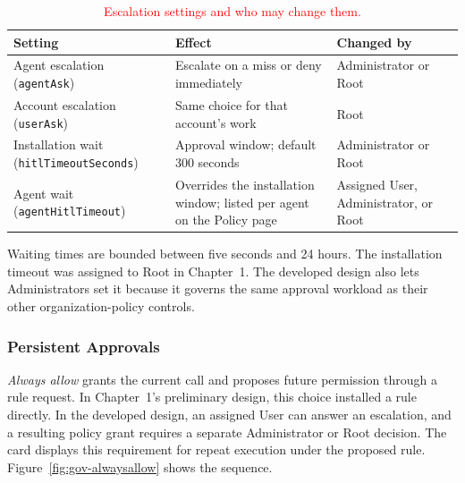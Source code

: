 \begin{table}[htbp]
\centering
\caption{\textcolor{red}{Escalation settings and who may change them.}}
\label{tab:gov-escalation-settings}
\small
\color{red}
\begin{tabular}{@{}>{\raggedright\arraybackslash}p{}
>{\raggedright\arraybackslash}p{}
>{\raggedright\arraybackslash}p{}@{}}
\toprule
Setting & Effect & Changed by \\
\midrule
Agent escalation (\texttt{agentAsk}) & Escalate on a miss or deny immediately & Administrator or Root \\
Account escalation (\texttt{userAsk}) & Same choice for that account's work & Root \\
Installation wait (\texttt{hitlTimeoutSeconds}) & Approval window; default 300 seconds & Administrator or Root \\
Agent wait (\texttt{agentHitlTimeout}) & Overrides the installation window; listed per agent on the Policy page & Assigned User, Administrator, or Root \\
\bottomrule
\end{tabular}
\end{table}

{\color{red}Waiting times are bounded between five seconds and 24 hours.
The installation timeout was assigned to Root in Chapter~1. The developed design also
lets Administrators set it because it governs the same approval workload as
their other organization-policy controls.}

\subsubsection{Persistent Approvals}
\label{sec:gov-persistent-approvals}

{\color{red}\textit{Always allow} grants the current call and proposes future permission
through a rule request. In Chapter~1's preliminary design, this choice installed
a rule directly. In the developed design, an assigned User can answer an
escalation, and a resulting policy grant requires a separate Administrator or
Root decision. The card displays this requirement for repeat execution under
the proposed rule. Figure~\ref{fig:gov-alwaysallow} shows the sequence.}

